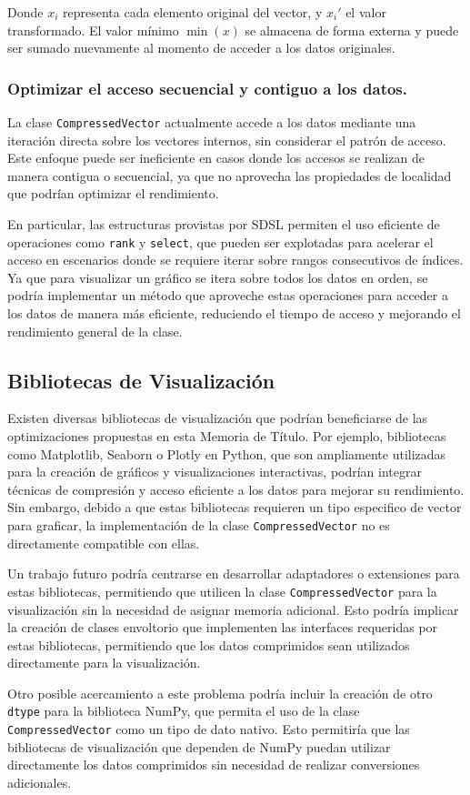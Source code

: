 Donde \( x_i \) representa cada elemento original del vector, y \( x_i' \) el valor transformado. El valor mínimo \(\min(x)\) se almacena de forma externa y puede ser sumado nuevamente al momento de acceder a los datos originales.


\subsubsection{Optimizar el acceso secuencial y contiguo a los datos.}

La clase \texttt{CompressedVector} actualmente accede a los datos mediante una iteración directa sobre los vectores internos, sin considerar el patrón de acceso. Este enfoque puede ser ineficiente en casos donde los accesos se realizan de manera contigua o secuencial, ya que no aprovecha las propiedades de localidad que podrían optimizar el rendimiento.

En particular, las estructuras provistas por SDSL permiten el uso eficiente de operaciones como \texttt{rank} y \texttt{select}, que pueden ser explotadas para acelerar el acceso en escenarios donde se requiere iterar sobre rangos consecutivos de índices. Ya que para visualizar un gráfico se itera sobre todos los datos en orden, se podría implementar un método que aproveche estas operaciones para acceder a los datos de manera más eficiente, reduciendo el tiempo de acceso y mejorando el rendimiento general de la clase.

\subsection{Bibliotecas de Visualización}

Existen diversas bibliotecas de visualización que podrían beneficiarse de las optimizaciones propuestas en esta Memoria de Título. Por ejemplo, bibliotecas como Matplotlib, Seaborn o Plotly en Python, que son ampliamente utilizadas para la creación de gráficos y visualizaciones interactivas, podrían integrar técnicas de compresión y acceso eficiente a los datos para mejorar su rendimiento. Sin embargo, debido a que estas bibliotecas requieren un tipo especifico de vector para graficar, la implementación de la clase \texttt{CompressedVector} no es directamente compatible con ellas.

Un trabajo futuro podría centrarse en desarrollar adaptadores o extensiones para estas bibliotecas, permitiendo que utilicen la clase \texttt{CompressedVector} para la visualización sin la necesidad de asignar memoria adicional. Esto podría implicar la creación de clases envoltorio que implementen las interfaces requeridas por estas bibliotecas, permitiendo que los datos comprimidos sean utilizados directamente para la visualización.

Otro posible acercamiento a este problema podría incluir la creación de otro \texttt{dtype} para la biblioteca NumPy, que permita el uso de la clase \texttt{CompressedVector} como un tipo de dato nativo. Esto permitiría que las bibliotecas de visualización que dependen de NumPy puedan utilizar directamente los datos comprimidos sin necesidad de realizar conversiones adicionales.

